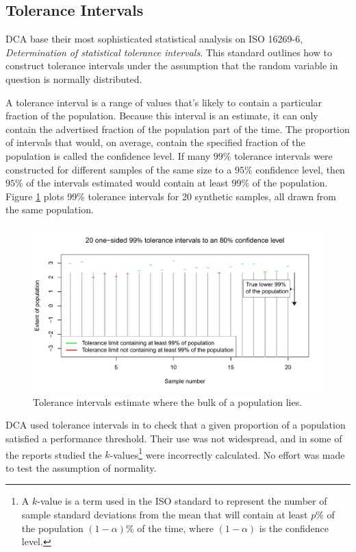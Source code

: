 \documentclass[11pt,a4paper,article]{memoir} %
\begin{document}
\par

\newpage
\subsection*{Tolerance Intervals}
DCA base their most sophisticated statistical analysis on ISO 16269-6, \emph{Determination of statistical tolerance intervals}. This standard outlines how to construct tolerance intervals under the assumption that the random variable in question is normally distributed.
\par
 A tolerance interval is a range of values that's likely to contain a particular fraction of the population. Because this interval is an estimate, it can only contain the advertised fraction of the population part of the time. The proportion of intervals that would, on average, contain the specified fraction of the population is called the confidence level. If many $99\%$ tolerance intervals were constructed for different samples of the same size to a $95\%$ confidence level, then $95\%$ of the intervals estimated would contain at least $99\%$ of the population. Figure \ref{fig:tolerance_intervals} plots 99\% tolerance intervals for 20 synthetic samples, all drawn from the same population.
\begin{figure}[h]
\includegraphics[width=\textwidth]{tolerance_intervals_2.pdf}
\caption{Tolerance intervals estimate where the bulk of a population lies.}
\label{fig:tolerance_intervals}
\end{figure}

DCA used tolerance intervals in to check that a given proportion of a population satisfied a performance threshold. Their use was not widespread, and in some of the reports studied the $k$-values\footnote{A $k$-value is a term used in the ISO standard to represent the number of sample standard deviations from the mean that will contain at least $p\%$ of the population $(1 - \alpha)\%$ of the time, where $(1 - \alpha)$ is the confidence level.} were incorrectly calculated. No effort was made to test the assumption of normality. 
\end{document}

